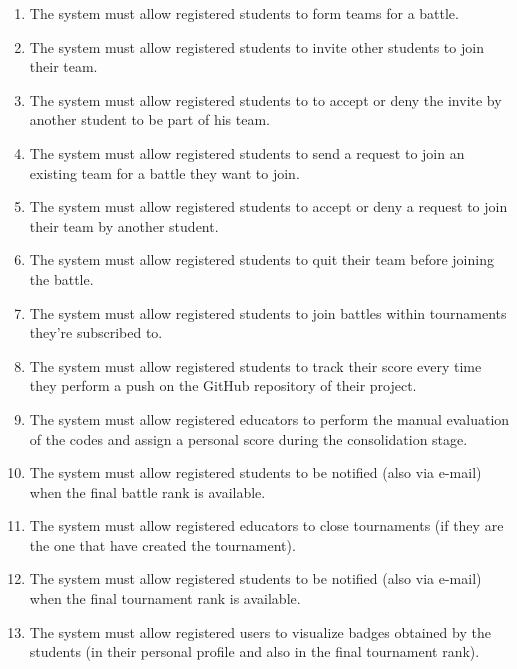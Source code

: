 \documentclass[a4paper, 11pt, titlepage]{article}
\begin{document}
\begin{enumerate}[font={\bfseries}, label={R\arabic* :}]
    \item The system must allow registered students to form teams for a battle.
    \item The system must allow registered students to invite other students to join their team. 
    \item The system must allow registered students to to accept or deny the invite by another student to be part of his team.
    \item The system must allow registered students to send a request to join an existing team for a battle they want to join.
    \item The system must allow registered students to accept or deny a request to join their team by another student.
    \item The system must allow registered students to quit their team before joining the battle.
    \item The system must allow registered students to join battles within tournaments they're subscribed to.
    \item The system must allow registered students to track their score every time they perform a push on the GitHub repository of their project.
    \item The system must allow registered educators to perform the manual evaluation of the codes and assign a personal score during the consolidation stage.
    \item The system must allow registered students to be notified (also via e-mail) when the final battle rank is available.
    \item The system must allow registered educators to close tournaments (if they are the one that have created the tournament).
    \item The system must allow registered students to be notified (also via e-mail) when the final tournament rank is available.
    \item The system must allow registered users to visualize badges obtained by the students (in their personal profile and also in the final tournament rank).
\end{enumerate}
\end{document}
